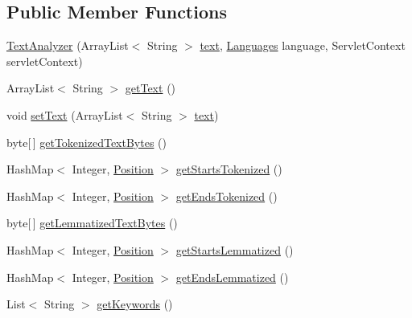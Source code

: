 \subsection*{Public Member Functions}
\begin{DoxyCompactItemize}
\item 
\hyperlink{classbr_1_1usp_1_1cata_1_1util_1_1_text_analyzer_a3f3e4da87b76db2e231e61628dd35f90}{Text\+Analyzer} (Array\+List$<$ String $>$ \hyperlink{classbr_1_1usp_1_1cata_1_1util_1_1_text_analyzer_a1cc14e76a5f9bac01a30199465155a68}{text}, \hyperlink{enumbr_1_1usp_1_1cata_1_1model_1_1_languages}{Languages} language, Servlet\+Context servlet\+Context)
\item 
Array\+List$<$ String $>$ \hyperlink{classbr_1_1usp_1_1cata_1_1util_1_1_text_analyzer_a6a672a8aac2461f42c69f3937bb4c599}{get\+Text} ()
\item 
void \hyperlink{classbr_1_1usp_1_1cata_1_1util_1_1_text_analyzer_a4c32749d82f3b7c8e6f4550677303f00}{set\+Text} (Array\+List$<$ String $>$ \hyperlink{classbr_1_1usp_1_1cata_1_1util_1_1_text_analyzer_a1cc14e76a5f9bac01a30199465155a68}{text})
\item 
byte\mbox{[}$\,$\mbox{]} \hyperlink{classbr_1_1usp_1_1cata_1_1util_1_1_text_analyzer_ac9f847326a0c649c262e75a041efb264}{get\+Tokenized\+Text\+Bytes} ()
\item 
Hash\+Map$<$ Integer, \hyperlink{classbr_1_1usp_1_1cata_1_1model_1_1_position}{Position} $>$ \hyperlink{classbr_1_1usp_1_1cata_1_1util_1_1_text_analyzer_a8a3a477c1b3750071ecc117e6ab04b30}{get\+Starts\+Tokenized} ()
\item 
Hash\+Map$<$ Integer, \hyperlink{classbr_1_1usp_1_1cata_1_1model_1_1_position}{Position} $>$ \hyperlink{classbr_1_1usp_1_1cata_1_1util_1_1_text_analyzer_ae0732529dc545b8ede43f002e2eea982}{get\+Ends\+Tokenized} ()
\item 
byte\mbox{[}$\,$\mbox{]} \hyperlink{classbr_1_1usp_1_1cata_1_1util_1_1_text_analyzer_a1c13774723b128cfdf78168900e012ca}{get\+Lemmatized\+Text\+Bytes} ()
\item 
Hash\+Map$<$ Integer, \hyperlink{classbr_1_1usp_1_1cata_1_1model_1_1_position}{Position} $>$ \hyperlink{classbr_1_1usp_1_1cata_1_1util_1_1_text_analyzer_af7c6b024a201d1604798ca9f68d2e928}{get\+Starts\+Lemmatized} ()
\item 
Hash\+Map$<$ Integer, \hyperlink{classbr_1_1usp_1_1cata_1_1model_1_1_position}{Position} $>$ \hyperlink{classbr_1_1usp_1_1cata_1_1util_1_1_text_analyzer_afeb0c9dfb6f7fdfcaa89f6bf38214d42}{get\+Ends\+Lemmatized} ()
\item 
List$<$ String $>$ \hyperlink{classbr_1_1usp_1_1cata_1_1util_1_1_text_analyzer_a71d3ec70b439088e2ede4c684ae72323}{get\+Keywords} ()
\end{DoxyCompactItemize}
